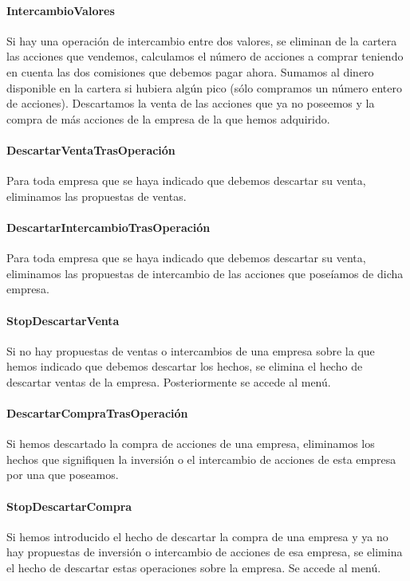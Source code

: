 \documentclass[11pt,leqno]{article}
\theoremstyle{definition_wo_parentheses}
\theoremstyle{plain}
\theoremstyle{remark}
\begin{document}
\paragraph{IntercambioValores} Si hay una operación de intercambio entre dos valores, se eliminan de la cartera las acciones que vendemos, calculamos el número de acciones a comprar teniendo en cuenta las dos comisiones que debemos pagar ahora. Sumamos al dinero disponible en la cartera si hubiera algún pico (sólo compramos un número entero de acciones). Descartamos la venta de las acciones que ya no poseemos y la compra de más acciones de la empresa de la que hemos adquirido.

\paragraph{DescartarVentaTrasOperación} Para toda empresa que se haya indicado que debemos descartar su venta, eliminamos las propuestas de ventas.

\paragraph{DescartarIntercambioTrasOperación} Para toda empresa que se haya indicado que debemos descartar su venta, eliminamos las propuestas de intercambio de las acciones que poseíamos de dicha empresa.

\paragraph{StopDescartarVenta} Si no hay propuestas de ventas o intercambios de una empresa sobre la que hemos indicado que debemos descartar los hechos, se elimina el hecho de descartar ventas de la empresa. Posteriormente se accede al menú.

\paragraph{DescartarCompraTrasOperación} Si hemos descartado la compra de acciones de una empresa, eliminamos los hechos que signifiquen la inversión o el intercambio de acciones de esta empresa por una que poseamos.

\paragraph{StopDescartarCompra} Si hemos introducido el hecho de descartar la compra de una empresa y ya no hay propuestas de inversión o intercambio de acciones de esa empresa, se elimina el hecho de descartar estas operaciones sobre la empresa. Se accede al menú.
\end{document}
